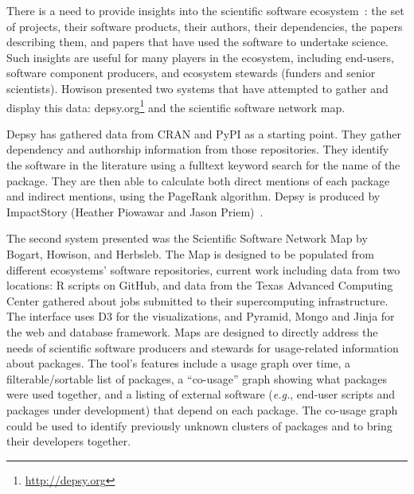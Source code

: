 \documentclass[a4paper,UKenglish]{dagrep}
\newcommand{\eg}{\emph{e.g.},\xspace}
\begin{document}


There is a need to provide insights into the scientific software ecosystem~\cite{bogart_mapping_2015}: the set of projects, their software products, their authors, their dependencies, the papers describing them, and papers that have used the software to undertake science.  Such insights are useful for many players in the ecosystem, including end-users, software component producers, and ecosystem stewards (funders and senior scientists). Howison presented two systems that have attempted to gather and display this data: depsy.org\footnote{\url{http://depsy.org}} and the scientific software network map.

Depsy has gathered data from CRAN and PyPI as a starting point. They gather dependency and authorship information from those repositories. They identify the software in the literature using a fulltext keyword search for the name of the package. They are then able to calculate both direct mentions of each package and indirect mentions, using the PageRank algorithm.  Depsy is produced by ImpactStory (Heather Piowawar and Jason Priem)~\cite{singh_chawla_unsung_2016}.

The second system presented was the Scientific Software Network Map by Bogart, Howison, and Herbsleb. The Map is designed to be populated from different ecosystems' software repositories, current work including data from two locations: R scripts on GitHub, and data from the Texas Advanced Computing Center gathered about jobs submitted to their supercomputing infrastructure.  The interface uses D3 for the visualizations, and Pyramid, Mongo and Jinja for the web and database framework. Maps are designed to directly address the needs of scientific software producers and stewards for usage-related information about packages. The tool's features include a usage graph over time, a filterable/sortable list of packages, a ``co-usage'' graph showing what packages were used together, and a listing of external software (\eg end-user scripts and packages under development) that depend on each package. The co-usage graph could be used to identify previously unknown clusters of packages and to bring their developers together.
\end{document}
